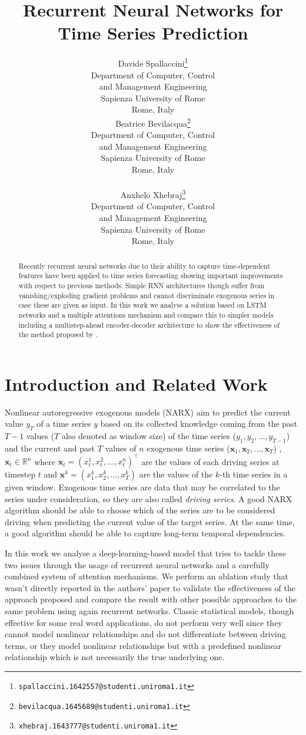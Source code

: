 \documentclass{article}
\title{Recurrent Neural Networks for Time Series Prediction}
\author{
  Davide Spallaccini\thanks{\texttt{spallaccini.1642557@studenti.uniroma1.it}}
\\
  Department of Computer, Control \\ and Management Engineering\\
  Sapienza University of Rome\\
  Rome, Italy \\
  \And
  Beatrice Bevilacqua\thanks{\texttt{bevilacqua.1645689@studenti.uniroma1.it}}
\\
  Department of Computer, Control \\ and Management Engineering\\
  Sapienza University of Rome\\
  Rome, Italy \\
   \\
  \And
  Anxhelo Xhebraj\thanks{\texttt{xhebraj.1643777@studenti.uniroma1.it}} \\
  Department of Computer, Control \\ and Management Engineering\\
  Sapienza University of Rome\\
  Rome, Italy
}
\begin{document}

\maketitle

\begin{abstract}

Recently recurrent neural networks due to their ability to capture time-dependent 
features have been applied to time series forecasting showing important 
improvements with respect to previous methods. Simple RNN architectures though
suffer from vanishing/exploding gradient problems and cannot discriminate exogenous series in case these are given as input. In this work we analyse a solution based on LSTM networks and a multiple attentions mechanism and compare this to simpler models including a multistep-ahead encoder-decoder architecture to show the effectiveness of the method proposed by \cite{da-rnn}.

\end{abstract}

\section{Introduction and Related Work}
\label{sec:intro}

Nonlinear autoregressive exogenous models (NARX) aim to predict the current
value $y_T$ of a time series $y$ based on its
collected knowledge coming from the past $T -1$ values ($T$ also denoted as window size) of
the time series ($y_{1}, y_{2}, ..., y_{T-1}$) and the current and past $T$ values of $n$
exogenous time series ($\mathbf{x}_{1}, \mathbf{x}_{2}, ..., \mathbf{x}_{T}$)
, $\mathbf{x}_t \in \mathbb{R}^n$ where $\mathbf{x}_t = (x_t^1, x_t^2, ..., x_t^n)^\top$
are the values of each driving series at timestep $t$ and $\mathbf{x}^k =
(x_1^k, x_2^k, ..., x_T^k)$ are the values of the $k$-th time series in a given
window. Exogenous time series
are data that may be correlated to the series under consideration, so they are
also called \textit{driving series}. A good NARX algorithm should be able to choose which of the series are to be
considered driving when predicting the current value of the target series.
At the same time, a good algorithm should be able to capture long-term temporal
dependencies.

In this work we analyse a deep-learning-based model that tries to tackle
these two issues through the usage of
recurrent neural networks and a carefully combined system of attention
mechanisms. We perform an ablation study that wasn't directly reported in the
authors' paper to validate the effectiveness of the approach proposed and
compare the result with other possible approaches to the same problem using
again recurrent networks. 
Classic statistical models, though effective for some real word applications,
do not perform very well since they cannot
model nonlinear relationships and do not differentiate between driving terms, or
they model nonlinear relationships
but with a predefined nonlinear relationship which is not necessarily the true
underlying one.
\end{document}

